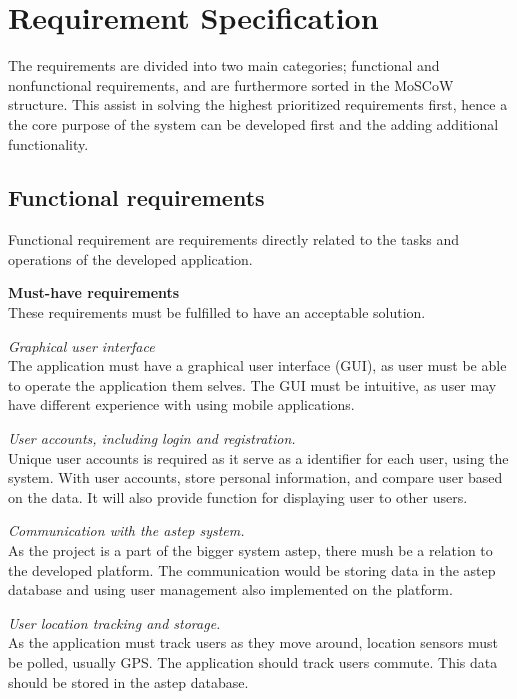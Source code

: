 \section{Requirement Specification}\label{sec:req}
The requirements are divided into two main categories; functional and nonfunctional requirements, and are furthermore sorted in the MoSCoW \cite{moscow} structure.
This assist in solving the highest prioritized requirements first, hence a the core purpose of the system can be developed first and the adding additional functionality.


\subsection{Functional requirements}
Functional requirement are requirements directly related to the tasks and operations of the developed application.

\textbf{Must-have requirements}\\
These requirements must be fulfilled to have an acceptable solution.

\textit{Graphical user interface}\\
The application must have a graphical user interface (GUI), as user must be able to operate the application them selves. 
The GUI must be intuitive, as user may have different experience with using mobile applications.

\textit{User accounts, including login and registration.}\\
Unique user accounts is required as it serve as a identifier for each user, using the system. With user accounts, store personal information, and compare user based on the data. 
It will also provide function for displaying user to other users.

\textit{Communication with the \gls{astep} system.}\\
As the project is a part of the bigger system \gls{astep}, there mush be a relation to the developed platform. 
The communication would be storing data in the \gls{astep} database and using user management also implemented on the platform.

\textit{User location tracking and storage.}\\
As the application must track users as they move around, location sensors must be polled, usually GPS. 
The application should track users commute.
This data should be stored in the \gls{astep} database.

